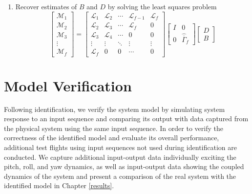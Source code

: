 \begin{table}[!htb]
{\begin{minipage}{5.5in}
\begin{enumerate}
\item Recover estimates of $B$ and $D$ by solving the least squares problem
\begin{equation*}
\begin{bmatrix}\mathcal{M}_1\\ \mathcal{M}_2\\ \mathcal{M}_3\\ \vdots\\ \mathcal{M}_f\end{bmatrix} = 
\begin{bmatrix}
\mathcal{L}_1 & \mathcal{L}_2 & \cdots & \mathcal{L}_{f-1} & \mathcal{L}_f\\
\mathcal{L}_2 & \mathcal{L}_3 & \cdots & \mathcal{L}_{f} & 0\\
\mathcal{L}_3 & \mathcal{L}_4 & \cdots & 0 & 0\\
\vdots & \vdots & \ddots & \vdots & \vdots\\
\mathcal{L}_f & 0 & 0 & \cdots & 0
\end{bmatrix}
\begin{bmatrix}I & 0\\ 0 & \hat{\overline{\Gamma}}_f\end{bmatrix}
\begin{bmatrix}D \\ B\end{bmatrix}
\end{equation*}
\end{enumerate}
\end{minipage}}
\end{table}


\section{Model Verification}
Following identification, we verify the system model by simulating system response to an input sequence and comparing its output with data captured from the physical system using the same input sequence. In order to verify the correctness of the identified model and evaluate its overall performance, additional test flights using input sequences not used during identification are conducted. We capture additional input-output data individually exciting the pitch, roll, and yaw dynamics, as well as input-output data showing the coupled dynamics of the system and present a comparison of the real system with the identified model in Chapter \ref{results}.




